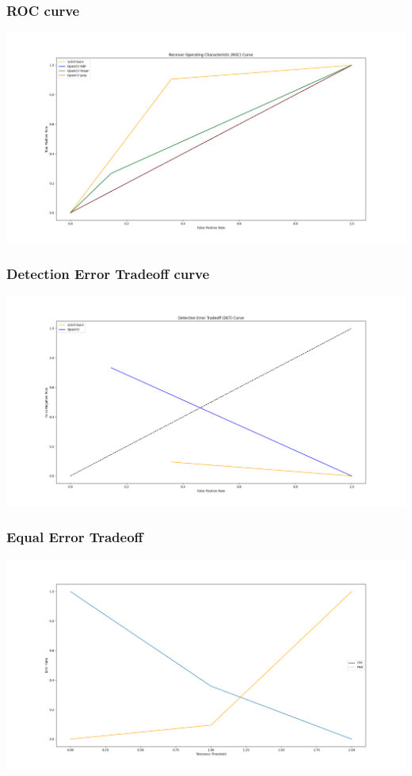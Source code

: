 \documentclass{beamer}
\begin{document}
\begin{frame}
    \frametitle{ROC curve}
    \begin{center}
        \includegraphics[scale=0.23]{../report/images/roc.png}
    \end{center}
\end{frame}

\begin{frame}
    \frametitle{Detection Error Tradeoff curve}
    \begin{center}
        \includegraphics[scale=0.23]{../report/images/det.png}
    \end{center}
\end{frame}

\begin{frame}
    \frametitle{Equal Error Tradeoff}
    \begin{center}
        \includegraphics[scale=0.23]{../report/images/eet.png}
    \end{center}
\end{frame}
\end{document}
